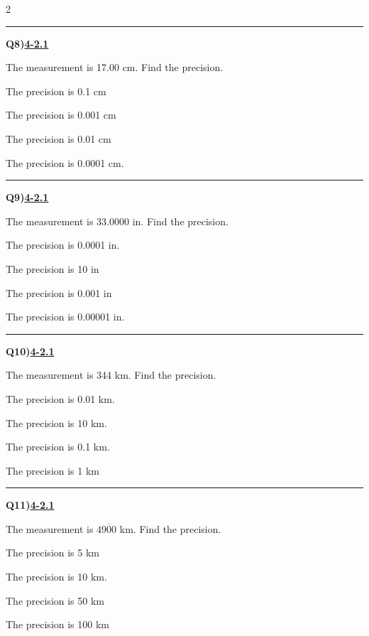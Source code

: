 \documentclass[11pt]{article}
\newenvironment{Qbox}[2]{%
  \par\medskip\noindent\begin{minipage}{\linewidth}%
  \hrule\medskip%
  \textbf{Q#1)}\hfill\textbf{\underline{#2}}\par\smallskip%
}{\par\end{minipage}\par\medskip}
\begin{document}
\begin{multicols}{2}
\begin{Qbox}{8}{4-2.1}
The measurement is 17.00 cm. Find the precision.
\begin{choices}
  \item The precision is 0.1 cm
  \item The precision is 0.001 cm
  \item The precision is 0.01 cm
  \item The precision is 0.0001 cm.
\end{choices}
\end{Qbox}

\begin{Qbox}{9}{4-2.1}
The measurement is 33.0000 in. Find the precision.
\begin{choices}
  \item The precision is 0.0001 in.
  \item The precision is 10 in
  \item The precision is 0.001 in
  \item The precision is 0.00001 in.
\end{choices}
\end{Qbox}

\begin{Qbox}{10}{4-2.1}
The measurement is 344 km. Find the precision.
\begin{choices}
  \item The precision is 0.01 km.
  \item The precision is 10 km.
  \item The precision is 0.1 km.
  \item The precision is 1 km
\end{choices}
\end{Qbox}

\begin{Qbox}{11}{4-2.1}
The measurement is $49\overline{0}0$ km. Find the precision.
\begin{choices}
  \item The precision is 5 km
  \item The precision is 10 km.
  \item The precision is 50 km
  \item The precision is 100 km
\end{choices}
\end{Qbox}


\end{multicols}
\end{document}
